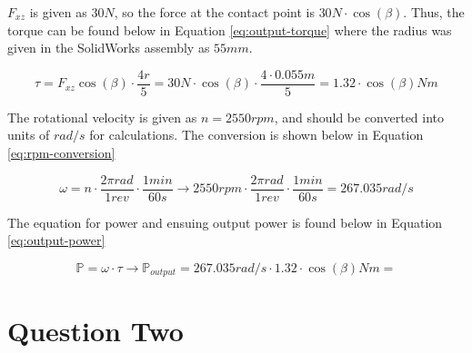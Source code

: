 \documentclass[12pt]{article}
\begin{document}
        $F_{xz}$ is given as $30N$, so the force at the contact point is $30N \cdot \cos(\beta)$. Thus, the torque can be found below in Equation \ref{eq:output-torque} where the 
        radius was given in the SolidWorks assembly as $55mm$.

        \begin{equation}
            \tau = F_{xz}\cos(\beta) \cdot \frac{4r}{5} = 30N \cdot \cos(\beta) \cdot \frac{4 \cdot 0.055m}{5} = 1.32 \cdot \cos(\beta)Nm
        \label{eq:output-torque}
        \end{equation}

        The rotational velocity is given as $n = 2550rpm$, and should be converted into units of $rad/s$ for calculations. The conversion is 
        shown below in Equation \ref{eq:rpm-conversion}

        \begin{equation}
            \omega = n\cdot \frac{2 \pi rad}{1 rev} \cdot \frac{1min}{60s} \rightarrow 2550rpm \cdot \frac{2 \pi rad}{1 rev} \cdot \frac{1min}{60s} = 267.035rad/s
        \label{eq:rpm-conversion}
        \end{equation}

        The equation for power and ensuing output power is found below in Equation \ref{eq:output-power}

        \begin{equation}
           \mathbb{P} = \omega \cdot \tau \rightarrow \mathbb{P}_{output} = 267.035rad/s \cdot 1.32 \cdot \cos(\beta)Nm = 
        \label{eq:output-power}
        \end{equation}
    \section{Question Two}
\end{document}

